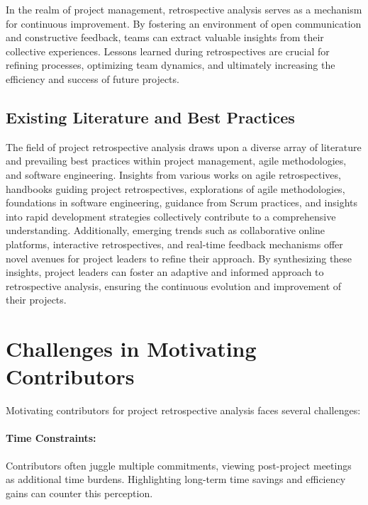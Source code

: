 \documentclass{article}
\begin{document}
In the realm of project management, retrospective analysis serves as a mechanism for continuous improvement. By fostering an environment of open communication and constructive feedback, teams can extract valuable insights from their collective experiences. Lessons learned during retrospectives are crucial for refining processes, optimizing team dynamics, and ultimately increasing the efficiency and success of future projects.

\subsection{Existing Literature and Best Practices}
The field of project retrospective analysis draws upon a diverse array of literature and prevailing best practices within project management, agile methodologies, and software engineering. Insights from various works on agile retrospectives, handbooks guiding project retrospectives, explorations of agile methodologies, foundations in software engineering, guidance from Scrum practices, and insights into rapid development strategies collectively contribute to a comprehensive understanding. Additionally, emerging trends such as collaborative online platforms, interactive retrospectives, and real-time feedback mechanisms offer novel avenues for project leaders to refine their approach. By synthesizing these insights, project leaders can foster an adaptive and informed approach to retrospective analysis, ensuring the continuous evolution and improvement of their projects. \cite{5784234}

\newpage
\section{Challenges in Motivating Contributors}

\noindent Motivating contributors for project retrospective analysis faces several challenges:

\paragraph*{Time Constraints:}Contributors often juggle multiple commitments, viewing post-project meetings as additional time burdens. Highlighting long-term time savings and efficiency gains can counter this perception.
\end{document}
